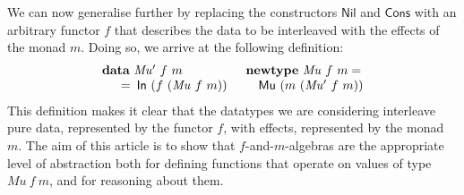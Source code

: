 \documentclass{jfp1}
\newcommand{\kw}[1]{\textbf{#1}}
\begin{document}
We can now generalise further by replacing the constructors
$\mathsf{Nil}$ and $\mathsf{Cons}$ with an arbitrary functor $f$ that
describes the data to be interleaved with the effects of the monad
$m$. Doing so, we arrive at the following definition:
\begin{displaymath}
  \begin{array}{ll}
    \kw{data}~\mathit{Mu'}~f~m
    &
    \kw{newtype}~\mathit{Mu}~f~m = 
    \\
    \quad
    \begin{array}[t]{c@{\hspace{0.5em}}l}
      = & \mathsf{In}~(f~(\mathit{Mu}~f~m))
    \end{array}
    &
    \quad \mathsf{Mu}~(m~(\mathit{Mu'}~f~m))
  \end{array}
\end{displaymath}
This definition makes it clear that the datatypes we are considering
interleave pure data, represented by the functor $f$, with effects,
represented by the monad $m$. The aim of this article is to show that
$f$-and-$m$-algebras are the appropriate level of abstraction both for
defining functions that operate on values of type $\mathit{Mu}~f~m$,
and for reasoning about them.


\end{document}

